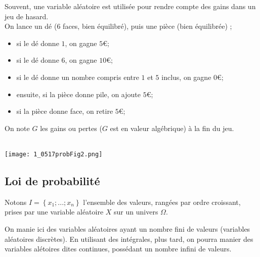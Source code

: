 \documentclass[a4paper,11pt]{article} \usepackage{FBarticle} \mapage{831}{Probabilités 1} %
\begin{document}
\begin{multicols}{2}
\exem Souvent, une variable aléatoire est utilisée pour rendre compte des gains dans un jeu de hasard.\\
On lance un dé ($6$ faces, bien équilibré), puis une pièce (bien équilibrée) ;
\begin{itemize}
\item si le dé donne $1$, on gagne $5$\euro ;
\item si le dé donne $6$, on gagne $10$\euro ;
\item si le dé donne un nombre compris entre $1$ et $5$ inclus, on gagne $0$\euro ;
\item ensuite, si la pièce donne pile, on ajoute $5$\euro ;
\item si la pièce donne face, on retire $5$\euro ;
\end{itemize}
On note $G$ les gains ou pertes ($G$ est en valeur algébrique) à la fin du jeu.

\\
\texttt{[image: 1\_0517probFig2.png]}\par


\subsection{Loi de probabilité}
Notons $I=\left\{x_1;...;x_n\right\}$ l'ensemble des valeurs, rangées par ordre croissant, prises par une variable aléatoire $X$ sur un univers $\Omega$.\par
\rema On manie ici des variables aléatoires ayant un nombre fini de valeurs (variables aléatoires discrètes). En utilisant des intégrales, plus tard, on pourra manier des variables alétoires dites continues, possédant un nombre infini de valeurs.\par


\end{multicols}
\end{document}
